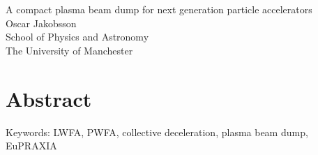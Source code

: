 \noindent A compact plasma beam dump for next generation particle accelerators \\
Oscar Jakobsson\\
School of Physics and Astronomy\\
The University of Manchester \setlength{\parskip}{0.5cm}

\thispagestyle{plain}			%
\setlength{\parskip}{0pt plus 1.0pt}
\section*{Abstract}


\vfill
Keywords: LWFA, PWFA, collective deceleration, plasma beam dump, EuPRAXIA

